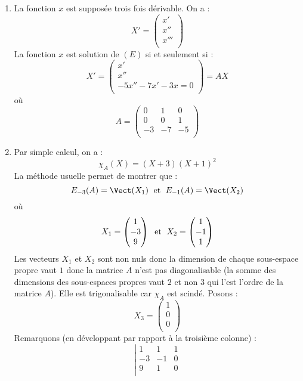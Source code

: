 \documentclass[a4paper,twoside,french,11pt]{VcCours}
\begin{document}
\begin{enumerate}
\item La fonction $x$ est supposée trois fois dérivable. On a :
$$ X' = \begin{pmatrix}
x' \\
x'' \\
x''' \\
\end{pmatrix} $$
La fonction $x$ est solution de $(E)$ si et seulement si :
$$ X' = \begin{pmatrix}
x' \\
x'' \\
-5x''-7x'-3x=0 \\
\end{pmatrix} = A X$$
où
$$ A = \begin{pmatrix}
0 & 1 & 0 \\
0 & 0 & 1 \\
-3& -7 & -5 \\
\end{pmatrix}$$
\item Par simple calcul, on a :
$$ \chi_A(X) = (X+3)(X+1)^2$$
La méthode usuelle permet de montrer que :
$$ E_{-3}(A) = \Vect(X_1) \; \hbox{ et } \;  E_{-1}(A) = \Vect(X_2)$$
où
$$ X_1 = \begin{pmatrix}
1 \\
-3 \\
9 \\
\end{pmatrix}  \; \hbox{ et } \; X_2 = \begin{pmatrix}
1 \\
-1 \\
1 
\end{pmatrix}$$
Les vecteurs $X_1$ et $X_2$ sont non nuls donc la dimension de chaque sous-espace propre vaut $1$ donc la matrice $A$ n'est pas diagonalisable (la somme des dimensions des sous-espaces propres vaut $2$ et non $3$ qui l'est l'ordre de la matrice $A$). Elle est trigonalisable car $\chi_A$ est scindé. Posons :
$$ X_3 = \begin{pmatrix}
1 \\
0 \\
0 \\
\end{pmatrix}$$
Remarquons (en développant par rapport à la troisième colonne) :
$$ \left\vert \begin{array}{ccc}
1 & 1 & 1 \\
-3 & -1 & 0 \\
9 & 1 & 0 \\

\end{array}$$
\end{enumerate}
\end{document}
